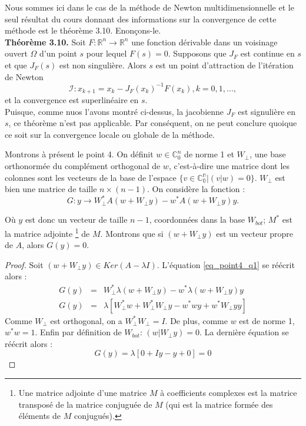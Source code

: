 Nous sommes ici dans le cas de la méthode de Newton multidimensionnelle et le seul résultat du cours donnant des informations sur la convergence de cette méthode est le théorème 3.10. Enonçons-le.\\
\textbf{Théorème 3.10.} Soit $F : \mathbb{R}^n \rightarrow \mathbb{R}^n$ une fonction dérivable dans un voisinage ouvert $\Omega$ d'un point $s$ pour lequel $F(s)=0$. Supposons que $J_F$ est continue en $s$ et que $J_F(s)$ est non singulière. Alors $s$ est un point d'attraction de l'itération de Newton $$\mathcal{I} : x_{k+1} = x_k - J_F(x_k)^{-1}F(x_k), k = 0,1,...,$$ et la convergence est superlinéaire en $s$.\\
Puisque, comme nuos l'avons montré ci-dessus, la jacobienne $J_F$ est signulière en $s$, ce théorème n'est pas applicable. Par conséquent, on ne peut conclure quoique ce soit sur la convergence locale ou globale de la méthode.



Montrons à présent le point 4. On définit $w \in \mathbb{C}_0^n$ de norme 1 et $W_{\bot}$, une base orthonormée du complément orthogonal de $w$, c'est-à-dire une matrice dont les colonnes sont les vecteurs de la base de l'espace $ \lbrace v\in \mathbb{C^n_0} | (v|w)=0 \rbrace$. $W_{\bot}$ est bien une matrice de taille $n \times (n-1)$. On considère la fonction : 
\begin{equation} \label{eq_point4_q1}
 G:y \rightarrow W_{\bot}^* A(w+ W_{\bot}y) - w^*A(w+ W_{\bot}y)y.
\end{equation}

Où $y$ est donc un vecteur de taille $n-1$, coordonnées dans la base $W_{bot}$; $M^*$ est la matrice adjointe \footnote{Une matrice adjointe d'une matrice $M$ à coefficients complexes est la matrice transposé de la matrice conjuguée de $M$ (qui est la matrice formée des éléments de $M$ conjugués).} de $M$.
Montrons que si $(w+ W_{\bot}y)$ est un vecteur propre de $A$, alors $G(y)=0$.
\begin{proof}
Soit $(w+ W_{\bot}y) \in Ker(A-\lambda I)$. L'équation \ref{eq_point4_q1} se réécrit alors : 
\begin{eqnarray}
G(y) &=& W_{\bot}^* \lambda (w+ W_{\bot}y) - w^*\lambda (w+ W_{\bot}y)y\\
G(y) &=& \lambda [W_{\bot}^* w + W_{\bot}^*W_{\bot}y - w^* wy + w^* W_{\bot}yy ] 
\end{eqnarray}
Comme $W_{\bot}$ est orthogonal, on a $W_{\bot}^* W_{\bot} = I$. De plus, comme $w$ est de norme 1, $w^* w=1$. Enfin par définition de $W_{bot}$: $(w| W_{\bot}y)=0$. La dernière équation se réécrit alors : 
$$G(y) = \lambda [0 + Iy - y + 0] = 0 $$
\end{proof}


